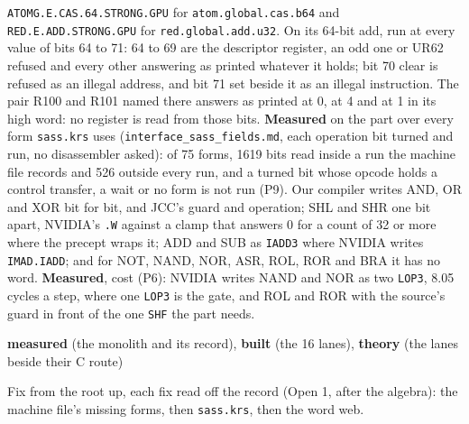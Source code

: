 \begin{description}
\texttt{ATOMG.\allowbreak{}E.\allowbreak{}CAS.\allowbreak{}64.\allowbreak{}STRONG.\allowbreak{}GPU} for \texttt{atom.\allowbreak{}global.\allowbreak{}cas.\allowbreak{}b64} and \texttt{RED.\allowbreak{}E.\allowbreak{}ADD.\allowbreak{}STRONG.\allowbreak{}GPU} for \texttt{red.\allowbreak{}global.\allowbreak{}add.\allowbreak{}u32}. On its 64-bit add, run at every value of bits 64 to 71: 64 to 69 are the descriptor register, an odd one or UR62 refused and every other answering as printed whatever it holds; bit 70 clear is refused as an illegal address, and bit 71 set beside it as an illegal instruction. The pair R100 and R101 named there answers as printed at 0, at 4 and at 1 in its high word: no register is read from those bits. \textbf{Measured} on the part over every form \texttt{sass.\allowbreak{}krs} uses (\texttt{interface\_\allowbreak{}sass\_\allowbreak{}fields.\allowbreak{}md}, each operation bit turned and run, no disassembler asked): of 75 forms, 1619 bits read inside a run the machine file records and 526 outside every run, and a turned bit whose opcode holds a control transfer, a wait or no form is not run (P9). Our compiler writes AND, OR and XOR bit for bit, and JCC's guard and operation; SHL and SHR one bit apart, NVIDIA's \texttt{.\allowbreak{}W} against a clamp that answers 0 for a count of 32 or more where the precept wraps it; ADD and SUB as \texttt{IADD3} where NVIDIA writes \texttt{IMAD.\allowbreak{}IADD}; and for NOT, NAND, NOR, ASR, ROL, ROR and BRA it has no word. \textbf{Measured}, cost (P6): NVIDIA writes NAND and NOR as two \texttt{LOP3}, 8.05 cycles a step, where one \texttt{LOP3} is the gate, and ROL and ROR with the source's guard in front of the one \texttt{SHF} the part needs.
\item[{status}] \textbf{measured} (the monolith and its record), \textbf{built} (the 16 lanes), \textbf{theory} (the lanes beside their C route)
\item[{next}] Fix from the root up, each fix read off the record (Open 1, after the algebra): the machine file's missing forms, then \texttt{sass.\allowbreak{}krs}, then the word web.
\end{description}


